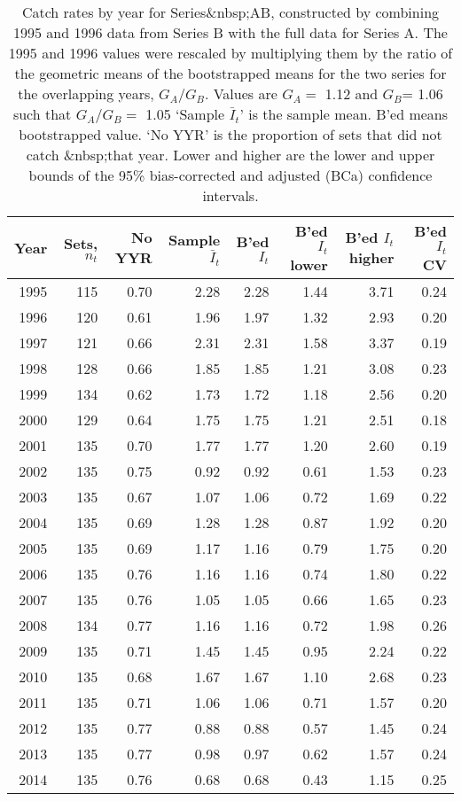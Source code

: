 \begin{table}[tp]
\centering
\caption{Catch rates by year for Series&nbsp;AB, constructed by combining 
     1995 and 1996 data
     from Series B with the full data for Series A. The 1995 and 1996 values
     were rescaled by multiplying them by the ratio of the geometric means
     of the bootstrapped means for the two series for the overlapping 
     years, $G_A / G_B$. Values are
     $G_A=$ 1.12  and $G_B$= 1.06 such that $G_A / G_B=$ 1.05 `Sample $\bar{I}_t$' is the sample mean. B'ed means bootstrapped 
     value. `No YYR' is the proportion of sets that did not catch \spName
     &nbsp;that year. Lower and higher are the 
     lower and upper bounds of the 95\% bias-corrected and adjusted (BCa)
     confidence intervals.} 
\label{tab:serAB}
\begin{tabular}{rrrrrrrr}
  \hline
Year & Sets, $n_t$ & No YYR & Sample $\bar{I}_t$ & B'ed $I_t$ & B'ed $I_t$ lower & B'ed $I_t$ higher & B'ed $I_t$ CV \\ 
  \hline
1995 & 115 & 0.70 & 2.28 & 2.28 & 1.44 & 3.71 & 0.24 \\ 
  1996 & 120 & 0.61 & 1.96 & 1.97 & 1.32 & 2.93 & 0.20 \\ 
  1997 & 121 & 0.66 & 2.31 & 2.31 & 1.58 & 3.37 & 0.19 \\ 
  1998 & 128 & 0.66 & 1.85 & 1.85 & 1.21 & 3.08 & 0.23 \\ 
  1999 & 134 & 0.62 & 1.73 & 1.72 & 1.18 & 2.56 & 0.20 \\ 
  2000 & 129 & 0.64 & 1.75 & 1.75 & 1.21 & 2.51 & 0.18 \\ 
  2001 & 135 & 0.70 & 1.77 & 1.77 & 1.20 & 2.60 & 0.19 \\ 
  2002 & 135 & 0.75 & 0.92 & 0.92 & 0.61 & 1.53 & 0.23 \\ 
  2003 & 135 & 0.67 & 1.07 & 1.06 & 0.72 & 1.69 & 0.22 \\ 
  2004 & 135 & 0.69 & 1.28 & 1.28 & 0.87 & 1.92 & 0.20 \\ 
  2005 & 135 & 0.69 & 1.17 & 1.16 & 0.79 & 1.75 & 0.20 \\ 
  2006 & 135 & 0.76 & 1.16 & 1.16 & 0.74 & 1.80 & 0.22 \\ 
  2007 & 135 & 0.76 & 1.05 & 1.05 & 0.66 & 1.65 & 0.23 \\ 
  2008 & 134 & 0.77 & 1.16 & 1.16 & 0.72 & 1.98 & 0.26 \\ 
  2009 & 135 & 0.71 & 1.45 & 1.45 & 0.95 & 2.24 & 0.22 \\ 
  2010 & 135 & 0.68 & 1.67 & 1.67 & 1.10 & 2.68 & 0.23 \\ 
  2011 & 135 & 0.71 & 1.06 & 1.06 & 0.71 & 1.57 & 0.20 \\ 
  2012 & 135 & 0.77 & 0.88 & 0.88 & 0.57 & 1.45 & 0.24 \\ 
  2013 & 135 & 0.77 & 0.98 & 0.97 & 0.62 & 1.57 & 0.24 \\ 
  2014 & 135 & 0.76 & 0.68 & 0.68 & 0.43 & 1.15 & 0.25 \\ 
   \hline
\end{tabular}
\end{table}


